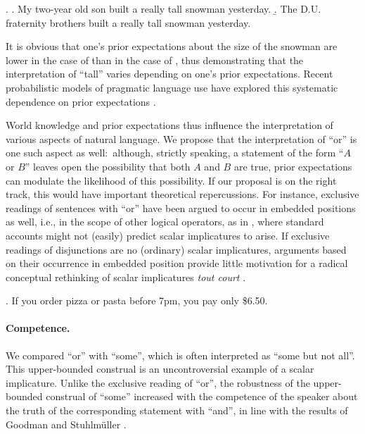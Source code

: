 \documentclass[12pt]{article}
\begin{document}
\ex.	\a. My two-year old son built a really tall snowman yesterday.
	\b. The D.U. fraternity brothers built a really tall snowman yesterday.
	
It is obvious that one's prior expectations about the size of the snowman are lower in the case
of \Last[a] than in the case of \Last[b], thus demonstrating that the interpretation of ``tall''
varies depending on one's prior expectations. Recent probabilistic models of pragmatic language
use have explored this systematic dependence on prior expectations
\citep[cf.,][]{LassiterGoodman2015:Adjectival-vagu,QingFranke2014:Gradable-Adject,SchollerFranke2015:Semantic-values}.

World knowledge and prior expectations thus influence the interpretation of various aspects of
natural language. We propose that the interpretation of ``or'' is one such aspect as well:\
although, strictly speaking, a statement of the form ``$A$ or $B$'' leaves open the possibility
that both $A$ and $B$ are true, prior expectations can modulate the likelihood of this
possibility. If our proposal is on the right track, this would have important theoretical
repercussions. For instance, exclusive readings of sentences with ``or'' have been argued to occur in
embedded positions as well, i.e., in the scope of other logical operators, as in \Next, where
standard accounts might not (easily) predict scalar implicatures to arise. If exclusive
readings of disjunctions are no (ordinary) scalar implicatures, arguments based on their
occurrence in embedded position provide little motivation for a radical conceptual rethinking of
scalar implicatures \emph{tout court} \citep[e.g.,][]{chierchia2004,chierchia2012,fox2007}.

\ex. If you order pizza or pasta before 7pm, you pay only \$6.50.

\paragraph{Competence.} We compared ``or'' with ``some'', which is often interpreted as ``some but
not all''. This upper-bounded construal is an uncontroversial example of a scalar
implicature. Unlike the exclusive reading of ``or'', the robustness of the upper-bounded
construal of ``some'' increased with the competence of the speaker about the truth of the
corresponding statement with ``and'', in line with the results of Goodman and Stuhlm\"{u}ller
\citeyearpar{goodman2013}. 
\end{document}

